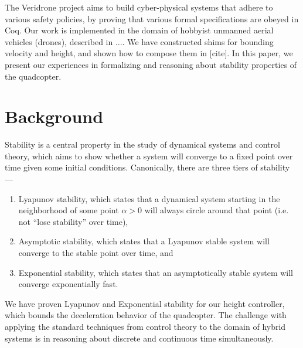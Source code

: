\documentclass[10pt]{sigplanconf}
\begin{document}
The Veridrone project aims to build cyber-physical systems that adhere to various safety policies, by proving that various formal specifications are obeyed in Coq. Our work is implemented in the domain of hobbyist unmanned aerial vehicles (drones), described in .... We have constructed shims for bounding velocity and height, and shown how to compose them in [cite]. In this paper, we present our experiences in formalizing and reasoning about stability properties of the quadcopter.





\section{Background}


Stability is a central property in the study of dynamical systems and control theory, which aims to show whether a system will converge to a fixed point over time given some initial conditions. Canonically, there are three tiers of stability ---

\begin{enumerate}
\item Lyapunov stability, which states that a dynamical system starting in the neighborhood of some point $\alpha > 0$ will always circle around that point (i.e. not ``lose stability'' over time),

\item  Asymptotic stability, which states that a Lyapunov stable system will converge to the stable point over time, and

\item  Exponential stability, which states that an asymptotically stable system will converge exponentially fast.
\end{enumerate}


We have proven Lyapunov and Exponential stability for our height controller, which bounds the deceleration behavior of the quadcopter. The challenge with applying the standard techniques from control theory to the domain of hybrid systems is in reasoning about discrete and continuous time simultaneously.
\end{document}
